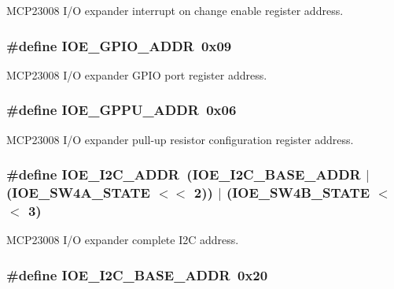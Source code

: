 M\-C\-P23008 I/\-O expander interrupt on change enable register address. \hypertarget{a00023_af2d85152c5775a221f107d6de547bca1}{
\subsubsection[{I\-O\-E\-\_\-\-G\-P\-I\-O\-\_\-\-A\-D\-D\-R}]{\setlength{\rightskip}{0pt plus 5cm}\#define I\-O\-E\-\_\-\-G\-P\-I\-O\-\_\-\-A\-D\-D\-R~0x09}}\label{a00023_af2d85152c5775a221f107d6de547bca1}
M\-C\-P23008 I/\-O expander G\-P\-I\-O port register address. \hypertarget{a00023_a91e588d697383f94de2bf7f11d9ecb4b}{
\subsubsection[{I\-O\-E\-\_\-\-G\-P\-P\-U\-\_\-\-A\-D\-D\-R}]{\setlength{\rightskip}{0pt plus 5cm}\#define I\-O\-E\-\_\-\-G\-P\-P\-U\-\_\-\-A\-D\-D\-R~0x06}}\label{a00023_a91e588d697383f94de2bf7f11d9ecb4b}
M\-C\-P23008 I/\-O expander pull-\/up resistor configuration register address. \hypertarget{a00023_ad615a329bea187ce779cf9930ba8a6fa}{
\subsubsection[{I\-O\-E\-\_\-\-I2\-C\-\_\-\-A\-D\-D\-R}]{\setlength{\rightskip}{0pt plus 5cm}\#define I\-O\-E\-\_\-\-I2\-C\-\_\-\-A\-D\-D\-R~({\bf I\-O\-E\-\_\-\-I2\-C\-\_\-\-B\-A\-S\-E\-\_\-\-A\-D\-D\-R} $|$ ({\bf I\-O\-E\-\_\-\-S\-W4\-A\-\_\-\-S\-T\-A\-T\-E} $<$$<$ 2)) $|$ ({\bf I\-O\-E\-\_\-\-S\-W4\-B\-\_\-\-S\-T\-A\-T\-E} $<$$<$ 3)}}\label{a00023_ad615a329bea187ce779cf9930ba8a6fa}
M\-C\-P23008 I/\-O expander complete I2\-C address. \hypertarget{a00023_ab848e49bf7c4ea73e4ef05f26b3c60e8}{
\subsubsection[{I\-O\-E\-\_\-\-I2\-C\-\_\-\-B\-A\-S\-E\-\_\-\-A\-D\-D\-R}]{\setlength{\rightskip}{0pt plus 5cm}\#define I\-O\-E\-\_\-\-I2\-C\-\_\-\-B\-A\-S\-E\-\_\-\-A\-D\-D\-R~0x20}}\label{a00023_ab848e49bf7c4ea73e4ef05f26b3c60e8}
